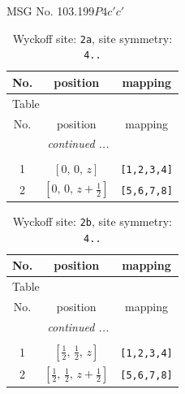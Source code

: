 \documentclass[fleqn,8pt]{jsarticle}
\begin{document}
\setcounter{MaxMatrixCols}{32}

\renewcommand{\tablename}{Table~}
\renewcommand{\figurename}{Figure~}
\begin{center}
\LARGE
MSG No. 103.199\quad$P4c'c'$
\end{center}
\renewcommand{\arraystretch}{1.2}
\begin{longtable}{ccc}
\caption{Wyckoff site: {\tt 2a}, site symmetry: {\tt 4..}}
 \\
 \hline \hline
No. & position & mapping \\ \hline \endfirsthead

\multicolumn{2}{l}{\tablename\ \thetable{}} \\
 \hline \hline
No. & position & mapping \\ \hline \endhead

 \hline \hline
\multicolumn{2}{r}{\footnotesize\it continued ...} \\ \endfoot

 \hline \hline
\multicolumn{2}{r}{} \\ \endlastfoot

1 & $\left[ 0,\, 0,\, z \right]$ & {\tt [1,2,3,4]} \\ \hline
2 & $\left[ 0,\, 0,\, z + \frac{1}{2} \right]$ & {\tt [5,6,7,8]} \\
\end{longtable}
\renewcommand{\arraystretch}{1.2}
\begin{longtable}{ccc}
\caption{Wyckoff site: {\tt 2b}, site symmetry: {\tt 4..}}
 \\
 \hline \hline
No. & position & mapping \\ \hline \endfirsthead

\multicolumn{2}{l}{\tablename\ \thetable{}} \\
 \hline \hline
No. & position & mapping \\ \hline \endhead

 \hline \hline
\multicolumn{2}{r}{\footnotesize\it continued ...} \\ \endfoot

 \hline \hline
\multicolumn{2}{r}{} \\ \endlastfoot

1 & $\left[ \frac{1}{2},\, \frac{1}{2},\, z \right]$ & {\tt [1,2,3,4]} \\ \hline
2 & $\left[ \frac{1}{2},\, \frac{1}{2},\, z + \frac{1}{2} \right]$ & {\tt [5,6,7,8]} \\
\end{longtable}
\end{document}
